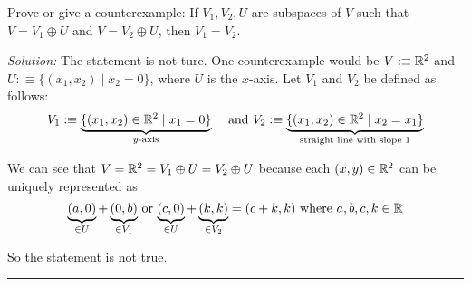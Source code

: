 \setcounter{xrcscount}{22}
\begin{xrcs}
  Prove or give a counterexample: If $V_1, V_2, U$ are subspaces of $V$ such that $V=V_1 \oplus U$ and $V=V_2 \oplus U$, then $V_1 = V_2$.

  \emph{Solution:} The statement is not ture. One counterexample would be $V :\equiv \mathbb{R}^2$ and $U :\equiv \{ (x_1, x_2) \mid x_2=0 \}$, where $U$ is the $x$-axis. Let $V_1$ and $V_2$ be defined as follows:
  \[
    V_1 :\equiv \underbrace{\{(x_1, x_2) \in \real^2 \mid x_1 = 0 \}}_{\text{$y$-axis}} \quad $ and $
    V_2 :\equiv \underbrace{\{ (x_1, x_2) \in \real^2 \mid x_2 = x_1 \}}_{\text{straight line with slope $1$}}
  \]

  We can see that $V=\mathbb{R}^2=V_1 \oplus U = V_2 \oplus U$  because each $(x,y)\in \mathbb{R}^2$ can be uniquely represented as \begin{equation}
    \underbrace{(a,0)}_{\in U}+\underbrace{(0,b)}_{\in V_1}$ or $\underbrace{(c,0)}_{\in U}+\underbrace{(k,k)}_{\in V_2}=(c+k,k)$ where $a,b,c,k \in \real
  \end{equation}

  So the statement is not true.
\end{xrcs}

\phantom{.}

\hrule

\clearpage